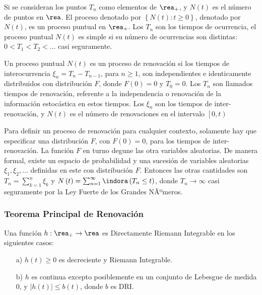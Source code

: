 Si se consideran los puntos $T_{n}$ como elementos de $\rea_{+}$, y $N\left(t\right)$ es el n\'umero de puntos en $\rea$. El proceso denotado por $\left\{N\left(t\right):t\geq0\right\}$, denotado por $N\left(t\right)$, es un proceso puntual en $\rea_{+}$. Los $T_{n}$ son los tiempos de ocurrencia, el proceso puntual $N\left(t\right)$ es simple si su n\'umero de ocurrencias son distintas: $0<T_{1}<T_{2}<\ldots$ casi seguramente.

\begin{Def}
Un proceso puntual $N\left(t\right)$ es un proceso de renovaci\'on si los tiempos de interocurrencia $\xi_{n}=T_{n}-T_{n-1}$, para $n\geq1$, son independientes e identicamente distribuidos con distribuci\'on $F$, donde $F\left(0\right)=0$ y $T_{0}=0$. Los $T_{n}$ son llamados tiempos de renovaci\'on, referente a la independencia o renovaci\'on de la informaci\'on estoc\'astica en estos tiempos. Los $\xi_{n}$ son los tiempos de inter-renovaci\'on, y $N\left(t\right)$ es el n\'umero de renovaciones en el intervalo $\left[0,t\right)$
\end{Def}


\begin{Note}
Para definir un proceso de renovaci\'on para cualquier contexto, solamente hay que especificar una distribuci\'on $F$, con $F\left(0\right)=0$, para los tiempos de inter-renovaci\'on. La funci\'on $F$ en turno degune las otra variables aleatorias. De manera formal, existe un espacio de probabilidad y una sucesi\'on de variables aleatorias $\xi_{1},\xi_{2},\ldots$ definidas en este con distribuci\'on $F$. Entonces las otras cantidades son $T_{n}=\sum_{k=1}^{n}\xi_{k}$ y $N\left(t\right)=\sum_{n=1}^{\infty}\indora\left(T_{n}\leq t\right)$, donde $T_{n}\rightarrow\infty$ casi seguramente por la Ley Fuerte de los Grandes NÃºmeros.
\end{Note}

%
\subsubsection{Teorema Principal de Renovaci\'on}
%

\begin{Note} Una funci\'on $h:\rea_{+}\rightarrow\rea$ es Directamente Riemann Integrable en los siguientes casos:
\begin{itemize}
\item[a)] $h\left(t\right)\geq0$ es decreciente y Riemann Integrable.
\item[b)] $h$ es continua excepto posiblemente en un conjunto de Lebesgue de medida 0, y $|h\left(t\right)|\leq b\left(t\right)$, donde $b$ es DRI.
\end{itemize}
\end{Note}

